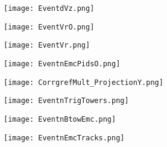 \documentclass{beamer}
\begin{document}
\begin{frame}
 	\begin{figure}[h!]
	\centering
	\texttt{[image: EventdVz.png]}
	\end{figure}
\end{frame}

\begin{frame}
 	\begin{figure}[h!]
	\centering
	\texttt{[image: EventVrO.png]}
	\end{figure}
\end{frame}

\begin{frame}
 	\begin{figure}[h!]
	\centering
	\texttt{[image: EventVr.png]}
	\end{figure}
\end{frame}

\begin{frame}
 	\begin{figure}[h!]
	\centering
	\texttt{[image: EventnEmcPidsO.png]}
	\end{figure}
\end{frame}

\begin{frame}
 	\begin{figure}[h!]
	\centering
	\texttt{[image: CorrgrefMult\_ProjectionY.png]}
	\end{figure}
\end{frame}

\begin{frame}
 	\begin{figure}[h!]
	\centering
	\texttt{[image: EventnTrigTowers.png]}
	\end{figure}
\end{frame}

\begin{frame}
 	\begin{figure}[h!]
	\centering
	\texttt{[image: EventnBtowEmc.png]}
	\end{figure}
\end{frame}

\begin{frame}
 	\begin{figure}[h!]
	\centering
	\texttt{[image: EventnEmcTracks.png]}
	\end{figure}
\end{frame}

\end{document}
